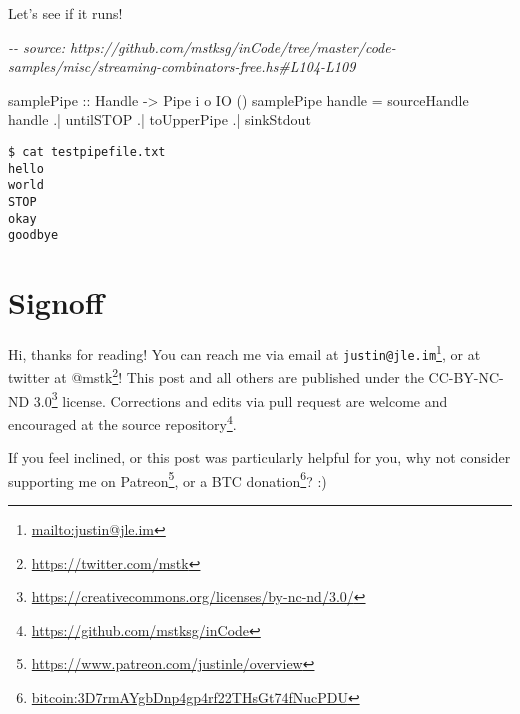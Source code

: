 \documentclass[]{article}
\newenvironment{Shaded}{}{}
\newcommand{\CommentTok}[1]{\textcolor[rgb]{0.38,0.63,0.69}{\textit{#1}}}
\newcommand{\DataTypeTok}[1]{\textcolor[rgb]{0.56,0.13,0.00}{#1}}
\newcommand{\NormalTok}[1]{#1}
\newcommand{\OperatorTok}[1]{\textcolor[rgb]{0.40,0.40,0.40}{#1}}
\newcommand{\OtherTok}[1]{\textcolor[rgb]{0.00,0.44,0.13}{#1}}
\newcommand{\StringTok}[1]{\textcolor[rgb]{0.25,0.44,0.63}{#1}}
\renewcommand{\href}[2]{#2\footnote{\url{#1}}}
\begin{document}
Let's see if it runs!

\begin{Shaded}
\begin{Highlighting}[]
\CommentTok{{-}{-} source: https://github.com/mstksg/inCode/tree/master/code{-}samples/misc/streaming{-}combinators{-}free.hs\#L104{-}L109}

\OtherTok{samplePipe ::} \DataTypeTok{Handle} \OtherTok{{-}>} \DataTypeTok{Pipe}\NormalTok{ i o }\DataTypeTok{IO}\NormalTok{ ()}
\NormalTok{samplePipe handle }\OtherTok{=}
\NormalTok{       sourceHandle handle}
    \OperatorTok{.|}\NormalTok{ untilSTOP}
    \OperatorTok{.|}\NormalTok{ toUpperPipe}
    \OperatorTok{.|}\NormalTok{ sinkStdout}
\end{Highlighting}
\end{Shaded}

\begin{verbatim}
$ cat testpipefile.txt
hello
world
STOP
okay
goodbye
\end{verbatim}

\begin{Shaded}
\end{Shaded}

\hypertarget{signoff}{%
\section{Signoff}\label{signoff}}

Hi, thanks for reading! You can reach me via email at
\href{mailto:justin@jle.im}{\nolinkurl{justin@jle.im}}, or at twitter at
\href{https://twitter.com/mstk}{@mstk}! This post and all others are published
under the \href{https://creativecommons.org/licenses/by-nc-nd/3.0/}{CC-BY-NC-ND
3.0} license. Corrections and edits via pull request are welcome and encouraged
at \href{https://github.com/mstksg/inCode}{the source repository}.

If you feel inclined, or this post was particularly helpful for you, why not
consider \href{https://www.patreon.com/justinle/overview}{supporting me on
Patreon}, or a \href{bitcoin:3D7rmAYgbDnp4gp4rf22THsGt74fNucPDU}{BTC donation}?
:)
\end{document}

